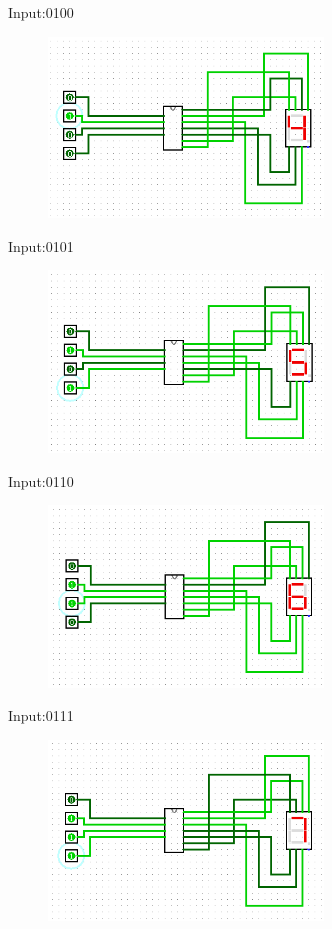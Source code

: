 \documentclass[]{article}
\begin{document}
Input:0100
\begin{figure}[H]
	\centering
	\includegraphics[width=0.65\textwidth]{4.png}
\end{figure}
Input:0101
\begin{figure}[H]
	\centering
	\includegraphics[width=0.65\textwidth]{5.png}
\end{figure}
Input:0110
\begin{figure}[H]
	\centering
	\includegraphics[width=0.65\textwidth]{6.png}
\end{figure}
Input:0111
\begin{figure}[H]
	\centering
	\includegraphics[width=0.65\textwidth]{7.png}
\end{figure}
\end{document}
